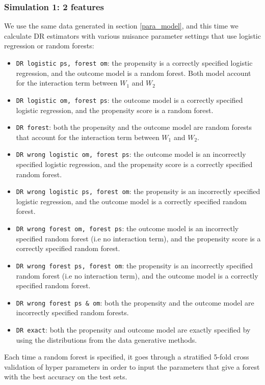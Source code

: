 \documentclass[12pt,twoside]{article}
\begin{document}
\subsubsection{Simulation 1: 2 features}

We use the same data generated in section \ref{para_model}, and this time we calculate DR estimators with various nuisance parameter settings that use logistic regression or random forests:
\begin{itemize}
    \item \texttt{DR logistic ps, forest om}: the propensity is a correctly specified logistic regression, and the outcome model is a random forest. Both model account for the interaction term between $W_1$ and $W_2$
    \item \texttt{DR logistic om, forest ps}: the outcome model is a correctly specified logistic regression, and the propensity score is a random forest.
    \item \texttt{DR forest}: both the propensity and the outcome model are random forests that account for the interaction term between $W_1$ and $W_2$.
    \item \texttt{DR wrong logistic om, forest ps}: the outcome model is an incorrectly specified logistic regression, and the propensity score is a correctly specified random forest.
    \item \texttt{DR wrong logistic ps, forest om}: the propensity is an incorrectly specified logistic regression, and the outcome model is a correctly specified random forest.
    \item \texttt{DR wrong forest om, forest ps}: the outcome model is an incorrectly specified random forest (i.e no interaction term), and the propensity score is a correctly specified random forest.
    \item \texttt{DR wrong forest ps, forest om}: the propensity is an incorrectly specified random forest (i.e no interaction term), and the outcome model is a correctly specified random forest.
    \item \texttt{DR wrong forest ps \& om}: both the propensity and the outcome model are incorrectly specified random forests.
    \item \texttt{DR exact}: both the propensity and outcome model are exactly specified by using the distributions from the data generative methods.
\end{itemize}

Each time a random forest is specified, it goes through a stratified 5-fold cross validation of hyper parameters in order to input the parameters that give a forest with the best accuracy on the test sets. 
\end{document}
